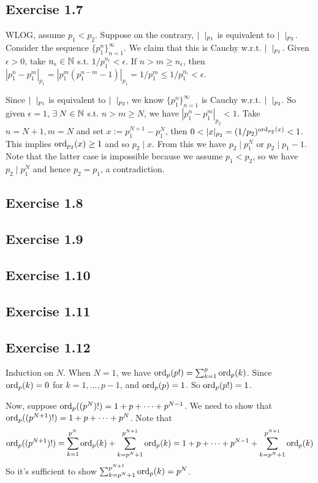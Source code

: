 \documentclass[../Koblitz.tex]{subfiles}
\begin{document}
\subsection*{Exercise 1.7}

WLOG, assume $p_1<p_2$. Suppose on the contrary, $\snr_{p_1}$ is equivalent to $\snr_{p_2}$. Consider the sequence $\{p_1^n\}_{n=1}^\infty$. We claim that this is Cauchy w.r.t. $\snr_{p_1}$. Given $\epsilon>0$, take $n_\epsilon\in\mathbb{N}$ s.t. $1/p_1^{n_\epsilon}<\epsilon$. If $n>m\geq n_\epsilon$, then $|p_1^n-p_1^m|_{p_1} = |p_1^m(p_1^{n-m}-1)|_{p_1} = 1/p_1^m \leq 1/p_1^{n_\epsilon} < \epsilon$.

Since $\snr_{p_1}$ is equivalent to $\snr_{p_2}$, we know $\{p_1^n\}_{n=1}^\infty$ is Cauchy w.r.t. $\snr_{p_2}$. So given $\epsilon=1$, $\exists N\in\NN$ s.t. $n>m\geq N$, we have $|p_1^n-p_1^m|_{p_2}<1$. Take $n=N+1,m=N$ and set $x:=p_1^{N+1}-p_1^N$, then $0<|x|_{p_2} = (1/p_2)^{\ord_{p_2}(x)} < 1$. This implies $\operatorname{ord}_{p_2}(x) \geq1$ and so $p_2\mid x$. From this we have $p_2\mid p_1^N$ or $p_2\mid p_1-1$. Note that the latter case is impossible because we assume $p_1<p_2$, so we have $p_2\mid p_1^N$ and hence $p_2=p_1$, a contradiction.

\subsection*{Exercise 1.8}

\subsection*{Exercise 1.9}

\subsection*{Exercise 1.10}

\subsection*{Exercise 1.11}

\subsection*{Exercise 1.12}

Induction on $N$. When $N=1$, we have $\operatorname{ord}_p(p!)=\sum_{k=1}^p \operatorname{ord}_p(k)$. Since $\operatorname{ord}_p(k)=0$ for $k=1,\ldots,p-1$, and $\operatorname{ord}_p(p)=1$. So $\operatorname{ord}_p(p!)=1$.

Now, suppose $\operatorname{ord}_p((p^N)!)=1+p+\cdots+p^{N-1}$. We need to show that $\operatorname{ord}_p((p^{N+1})!) = 1+p+\cdots+p^N$. Note that $$\operatorname{ord}_p((p^{N+1})!) = \sum_{k=1}^{p^N} \operatorname{ord}_p(k) + \sum_{k=p^N+1}^{p^{N+1}} \operatorname{ord}_p (k) = 1+p+\cdots+p^{N-1} + \sum_{k=p^N+1}^{p^{N+1}} \operatorname{ord}_p (k)$$ So it's sufficient to show $\sum_{k=p^N+1}^{p^{N+1}} \operatorname{ord}_p (k) = p^N$.
\end{document}
